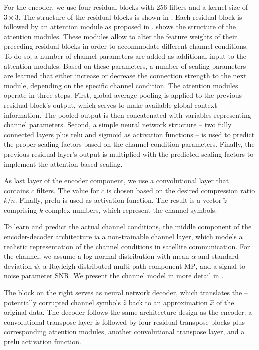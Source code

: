 \documentclass[conference]{IEEEtran}
\newcommand\MP{\ensuremath{\mathrm{MP}}\xspace}
\newcommand\SNR{\ensuremath{\mathrm{SNR}}\xspace}
\begin{document}
For the encoder, we use four residual blocks with 256 filters and a kernel size of $3 \times 3$.
The structure of the residual blocks is shown in .
Each residual block is followed by an attention module as proposed in \cite{wireless-attention-modules}.
 shows the structure of the attention modules.
These modules allow to alter the feature weights of their preceding residual blocks in order to accommodate different channel conditions.
To do so, a number of channel parameters are added as additional input to the attention modules.
Based on these parameters, a number of scaling parameters are learned that either increase or decrease the connection strength to the next module, depending on the specific channel condition.
The attention modules operate in three steps.
First, global average pooling is applied to the previous residual block's output, which serves to make available global context information.
The pooled output is then concatenated with variables representing channel parameters.
Second, a simple neural network structure -- two fully connected layers plus \ac{relu} and sigmoid as activation functions -- is used to predict the proper scaling factors based on the channel condition parameters.
Finally, the previous residual layer's output is multiplied with the predicted scaling factors to implement the attention-based scaling.

As last layer of the encoder component, we use a convolutional layer that contains $c$ filters.
The value for $c$ is chosen based on the desired compression ratio $k/n$.
Finally, \ac{prelu} is used as activation function.
The result is a vector $\tilde{z}$ comprising $k$ complex numbers, which represent the channel symbols.

To learn and predict the actual channel conditions, the middle component of the encoder-decoder architecture ia a non-trainable channel layer, which models a realistic representation of the channel conditions in satellite communication.
For the channel, we assume a log-normal distribution with mean $\alpha$ and standard deviation $\psi$, a Rayleigh-distributed multi-path component \MP, and a signal-to-noise parameter \SNR.
We present the channel model in more detail in .

The block on the right serves as neural network decoder, which translates the -- potentially corrupted channel symbols $\hat{z}$ back to an approximation $\hat{x}$ of the original data.
The decoder follows the same architecture design as the encoder: a convolutional transpose layer is followed by four residual transpose blocks plus corresponding attention modules,  another convolutional transpose layer, and a \ac{prelu} activation function.
\end{document}
